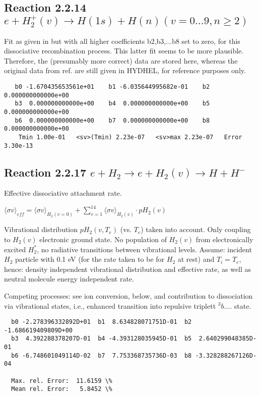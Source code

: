 \documentclass[12pt,dvipdfmx]{article}
\begin{document}
 \newpage
\subsection{
Reaction 2.2.14  $  e + H_2^+(v) \rightarrow H(1s) + H(n)   (v=0\ldots 9, n \geq 2)$}
Fit as given in \cite{kn:Janev}  but with all higher coefficients b2,b3,...b8 set to zero,
      for this dissociative recombination process.
      This latter fit seems to be more plausible. Therefore, the
      (presumably more correct)  data are stored here,
      whereas the original data from ref.\cite{kn:Janev} are still given in HYDHEL,
      for reference purposes only.



\begin{small}\begin{verbatim}
   b0 -1.670435653561e+01    b1 -6.035644995682e-01    b2  0.000000000000e+00
   b3  0.000000000000e+00    b4  0.000000000000e+00    b5  0.000000000000e+00
   b6  0.000000000000e+00    b7  0.000000000000e+00    b8  0.000000000000e+00
    Tmin 1.00e-01   <sv>(Tmin) 2.23e-07   <sv>max 2.23e-07   Error 3.30e-13
\end{verbatim}\end{small}


\newpage

\subsection{
Reaction 2.2.17  $e + H_2 \rightarrow e + H_2(v) \rightarrow H + H^-$
}
Effective dissociative attachment rate.

$ \langle\sigma v \rangle_{eff} = \langle\sigma v \rangle_{H_2(v=0)} + \sum_{v=1}^{14}
\langle\sigma v \rangle_{H_2(v)} \cdot pH_2(v) $

Vibrational distribution $pH_2(v,T_e)$ (vs. $T_e$) taken into
account. Only coupling
to $H_2(v)$ electronic ground state. No population of $H_2(v)$ from electronically
excited $H_2^*$, no radiative transitions between vibrational levels.
Assume: incident $H_2$ particle with 0.1 eV
(for the rate taken to be for $H_2$ at rest) and $T_i = T_e$,
hence: density independent vibrational distribution and effective
rate, as well as neutral molecule energy independent rate.

Competing processes: see ion conversion, below, and contribution to
dissociation via vibrational states, i.e., enhanced transition into
repulsive triplett $^3b....$ state.

\begin{small}\begin{verbatim}
  b0 -2.278396332892D+01  b1  8.634828071751D-01  b2 -1.686619409809D+00
  b3  4.392288378207D-01  b4 -4.393128035945D-01  b5  2.640299048385D-01
  b6 -6.748601049114D-02  b7  7.753368735736D-03  b8 -3.328288267126D-04

  Max. rel. Error:  11.6159 \%
  Mean rel. Error:   5.8452 \%
\end{verbatim}\end{small}
\end{document}
